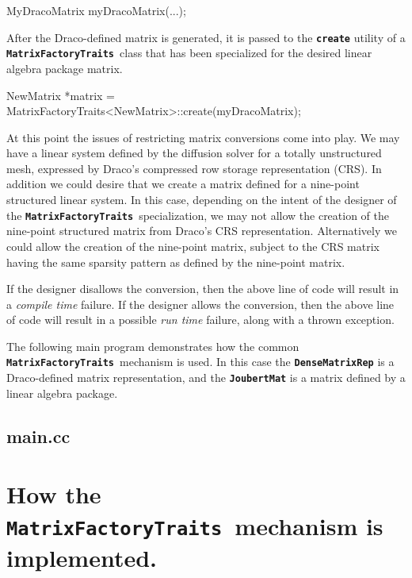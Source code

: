 \documentclass[11pt]{nmemo}
\newcommand{\cxxcode}{\color{codecolor}}
\newcommand{\code}[1]{\textbf{\texttt{\textcolor{codecolor}{#1}}}}
\newcommand{\MFT}{\code{Matrix\-Factory\-Traits}\ }
\begin{document}
\begin{ttfamily}
\cxxcode
  MyDracoMatrix myDracoMatrix(...);
\end{ttfamily}

After the Draco-defined matrix is generated, it is passed to the
\code{create} utility of a \MFT class
that has been specialized for the desired linear algebra package matrix.

\begin{ttfamily}
\cxxcode
  NewMatrix *matrix = 
    MatrixFactoryTraits<NewMatrix>::create(myDracoMatrix);
\end{ttfamily}

At this point the issues of restricting matrix conversions come into
play.
We may have a linear system defined by the diffusion
solver for a totally unstructured mesh, expressed by Draco's compressed row
storage representation (CRS).
In addition we could desire that we create a matrix defined for a
nine-point structured linear system.
In this case, depending on the intent of the designer of the
\MFT specialization,
we may not allow the creation of the nine-point structured matrix
from Draco's CRS representation.
Alternatively we could allow the creation
of the nine-point matrix, subject to the CRS matrix having the same
sparsity pattern as defined by the nine-point matrix.

If the designer disallows the conversion, then the above line of code
will result in a \emph{compile time} failure.
If the designer allows the conversion, then the above line of code
will result in a possible \emph{run time} failure, along with
a thrown exception.

The following main program demonstrates how the common
\MFT mechanism is used.
In this case the \code{DenseMatrixRep} is a Draco-defined matrix
representation, and the \code{JoubertMat} is a matrix defined by a
linear algebra package.

\subsection{main.cc}

\begin{ttfamily}
\begin{small}
\cxxcode

\end{small}
\end{ttfamily}

\section{How the \MFT mechanism is implemented.}
\end{document}
